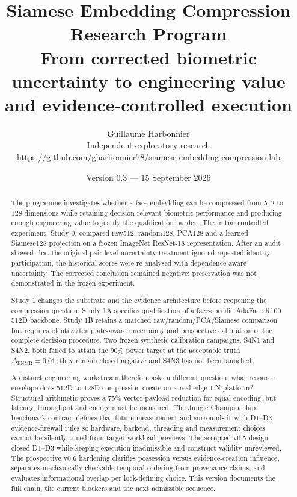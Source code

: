 \documentclass[10pt,a4paper]{article}
\title{\textbf{Siamese Embedding Compression Research Program}\\[4pt]
\large From corrected biometric uncertainty to engineering value and evidence-controlled execution}
\author{Guillaume Harbonnier\\
\small Independent exploratory research\\
\small \url{https://github.com/gharbonnier78/siamese-embedding-compression-lab}}
\date{Version 0.3 --- 15 September 2026}
\newcommand{\fnmr}{\mathrm{FNMR}}
\newcommand{\DeltaFNMR}{\Delta_{\fnmr}}
\begin{document}
\maketitle
\thispagestyle{empty}

\begin{center}
\end{center}

\begin{abstract}
The programme investigates whether a face embedding can be compressed from 512 to 128 dimensions while
retaining decision-relevant biometric performance and producing enough engineering value to justify the
qualification burden. The initial controlled experiment, Study 0, compared raw512, random128, PCA128 and a
learned Siamese128 projection on a frozen ImageNet ResNet-18 representation. After an audit showed that the
original pair-level uncertainty treatment ignored repeated identity participation, the historical scores were
re-analysed with dependence-aware uncertainty. The corrected conclusion remained negative: preservation was
not demonstrated in the frozen experiment.

Study 1 changes the substrate and the evidence architecture before reopening the compression question.
Study 1A specifies qualification of a face-specific AdaFace R100 512D backbone. Study 1B retains a matched
raw/random/PCA/Siamese comparison but requires identity/template-aware uncertainty and prospective calibration
of the complete decision procedure. Two frozen synthetic calibration campaigns, S4N1 and S4N2, both failed to
attain the 90\% power target at the acceptable truth $\DeltaFNMR=0.01$; they remain closed negative and S4N3
has not been launched.

A distinct engineering workstream therefore asks a different question: what resource envelope does 512D to
128D compression create on a real edge 1:N platform? Structural arithmetic proves a 75\% vector-payload
reduction for equal encoding, but latency, throughput and energy must be measured. The Jungle Championship
benchmark contract defines that future measurement and surrounds it with D1--D3 evidence-firewall rules so
hardware, backend, threading and measurement choices cannot be silently tuned from target-workload previews.
The accepted v0.5 design closed D1--D3 while keeping execution inadmissible and construct validity unreviewed.
The prospective v0.6 hardening clarifies possession versus evidence-creation influence, separates mechanically
checkable temporal ordering from provenance claims, and evaluates informational overlap per lock-defining
choice. This version documents the full chain, the current blockers and the next admissible sequence.
\end{abstract}
\end{document}

